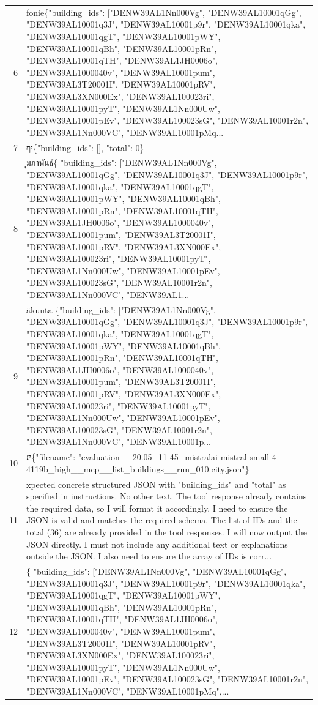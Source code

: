 \documentclass[a4paper,11pt]{article}
\begin{document}
\begin{table}[ht]
\begin{tabular}{r p{12cm}}
6 & fonie\{"building\_ids": ["DENW39AL1Nn000Vg", "DENW39AL10001qGg", "DENW39AL10001q3J", "DENW39AL10001p9r", "DENW39AL10001qka", "DENW39AL10001qgT", "DENW39AL10001pWY", "DENW39AL10001qBh", "DENW39AL10001pRn", "DENW39AL10001qTH", "DENW39AL1JH0006o", "DENW39AL1000040v", "DENW39AL10001pum", "DENW39AL3T20001I", "DENW39AL10001pRV", "DENW39AL3XN000Ex", "DENW39AL100023ri", "DENW39AL10001pyT", "DENW39AL1Nn000Uw", "DENW39AL10001pEv", "DENW39AL100023sG", "DENW39AL10001r2n", "DENW39AL1Nn000VC", "DENW39AL10001pMq... \\
7 & יף\{"building\_ids": [], "total": 0\} \\
8 & ุมภาพันธ์\{
  "building\_ids": ["DENW39AL1Nn000Vg", "DENW39AL10001qGg", "DENW39AL10001q3J", "DENW39AL10001p9r", "DENW39AL10001qka", "DENW39AL10001qgT", "DENW39AL10001pWY", "DENW39AL10001qBh", "DENW39AL10001pRn", "DENW39AL10001qTH", "DENW39AL1JH0006o", "DENW39AL1000040v", "DENW39AL10001pum", "DENW39AL3T20001I", "DENW39AL10001pRV", "DENW39AL3XN000Ex", "DENW39AL100023ri", "DENW39AL10001pyT", "DENW39AL1Nn000Uw", "DENW39AL10001pEv", "DENW39AL100023sG", "DENW39AL10001r2n", "DENW39AL1Nn000VC", "DENW39AL1... \\
9 & äkuuta
\{"building\_ids": ["DENW39AL1Nn000Vg", "DENW39AL10001qGg", "DENW39AL10001q3J", "DENW39AL10001p9r", "DENW39AL10001qka", "DENW39AL10001qgT", "DENW39AL10001pWY", "DENW39AL10001qBh", "DENW39AL10001pRn", "DENW39AL10001qTH", "DENW39AL1JH0006o", "DENW39AL1000040v", "DENW39AL10001pum", "DENW39AL3T20001I", "DENW39AL10001pRV", "DENW39AL3XN000Ex", "DENW39AL100023ri", "DENW39AL10001pyT", "DENW39AL1Nn000Uw", "DENW39AL10001pEv", "DENW39AL100023sG", "DENW39AL10001r2n", "DENW39AL1Nn000VC", "DENW39AL10001p... \\
10 & י׆\{"filename": "evaluation\_\_20.05\_11-45\_mistralai-mistral-small-4-4119b\_high\_\_mcp\_\_list\_buildings\_\_run\_010.city.json"\} \\
11 & xpected concrete structured JSON with "building\_ids" and "total" as specified in instructions. No other text. The tool response already contains the required data, so I will format it accordingly. I need to ensure the JSON is valid and matches the required schema. The list of IDs and the total (36) are already provided in the tool responses. I will now output the JSON directly. I must not include any additional text or explanations outside the JSON. I also need to ensure the array of IDs is corr... \\
12 & \{
  "building\_ids": ["DENW39AL1Nn000Vg", "DENW39AL10001qGg", "DENW39AL10001q3J", "DENW39AL10001p9r", "DENW39AL10001qka", "DENW39AL10001qgT", "DENW39AL10001pWY", "DENW39AL10001qBh", "DENW39AL10001pRn", "DENW39AL10001qTH", "DENW39AL1JH0006o", "DENW39AL1000040v", "DENW39AL10001pum", "DENW39AL3T20001I", "DENW39AL10001pRV", "DENW39AL3XN000Ex", "DENW39AL100023ri", "DENW39AL10001pyT", "DENW39AL1Nn000Uw", "DENW39AL10001pEv", "DENW39AL100023sG", "DENW39AL10001r2n", "DENW39AL1Nn000VC", "DENW39AL10001pMq",... \\

\end{tabular}
\end{table}
\end{document}
